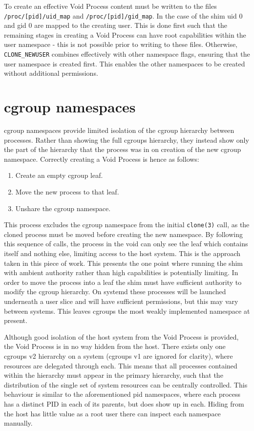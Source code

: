 \documentclass[a4paper,12pt,twoside,openright]{report}
\begin{document}
To create an effective Void Process content must be written to the files \texttt{/proc/[pid]/uid\_map} and \texttt{/proc/[pid]/gid\_map}. In the case of the shim uid 0 and gid 0 are mapped to the creating user. This is done first such that the remaining stages in creating a Void Process can have root capabilities within the user namespace - this is not possible prior to writing to these files. Otherwise, \texttt{CLONE\_NEWUSER} combines effectively with other namespace flags, ensuring that the user namespace is created first. This enables the other namespaces to be created without additional permissions.

\section{cgroup namespaces}
\label{sec:voiding-cgroup}

cgroup namespaces provide limited isolation of the cgroup hierarchy between processes. Rather than showing the full cgroups hierarchy, they instead show only the part of the hierarchy that the process was in on creation of the new cgroup namespace. Correctly creating a Void Process is hence as follows:

\begin{enumerate}
    \item Create an empty cgroup leaf.
    \item Move the new process to that leaf.
    \item Unshare the cgroup namespace.
\end{enumerate}

This process excludes the cgroup namespace from the initial \texttt{clone(3)} call, as the cloned process must be moved before creating the new namespace. By following this sequence of calls, the process in the void can only see the leaf which contains itself and nothing else, limiting access to the host system.  This is the approach taken in this piece of work. This presents the one point where running the shim with ambient authority rather than high capabilities is potentially limiting. In order to move the process into a leaf the shim must have sufficient authority to modify the cgroup hierarchy. On systemd these processes will be launched underneath a user slice and will have sufficient permissions, but this may vary between systems. This leaves cgroups the most weakly implemented namespace at present.

Although good isolation of the host system from the Void Process is provided, the Void Process is in no way hidden from the host. There exists only one cgroups v2 hierarchy on a system (cgroups v1 are ignored for clarity), where resources are delegated through each. This means that all processes contained within the hierarchy must appear in the primary hierarchy, such that the distribution of the single set of system resources can be centrally controlled. This behaviour is similar to the aforementioned pid namespaces, where each process has a distinct PID in each of its parents, but does show up in each. Hiding from the host has little value as a root user there can inspect each namespace manually.
\end{document}
